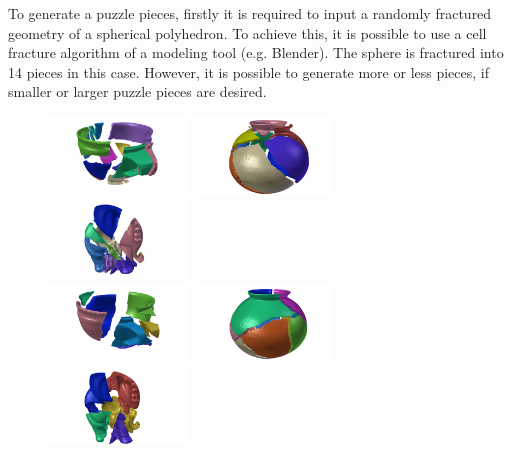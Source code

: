 \documentclass[acmlarge,screen,dvipsnames]{acmart}
\begin{document}
To generate a puzzle pieces, firstly it is required to input a
randomly fractured geometry of a spherical polyhedron. To achieve
this, it is possible to use a cell fracture algorithm of a modeling
tool (e.g. Blender). The sphere is fractured into 14 pieces in this
case. However, it is possible to generate more or less pieces, if
smaller or larger puzzle pieces are desired.
%
\begin{figure}[h]
  \includegraphics[width=0.33\textwidth]{images/ambercuppuzzle0}%
  \includegraphics[width=0.33\textwidth]{images/saltdeanpuzzle0}%
  \includegraphics[width=0.33\textwidth]{images/elephantpuzzle0}\\
  \includegraphics[width=0.33\textwidth]{images/ambercuppuzzle2}%
  \includegraphics[width=0.33\textwidth]{images/saltdeanpuzzle1}%
  \includegraphics[width=0.33\textwidth]{images/elephantpuzzle1}\\

\end{figure}
\end{document}
